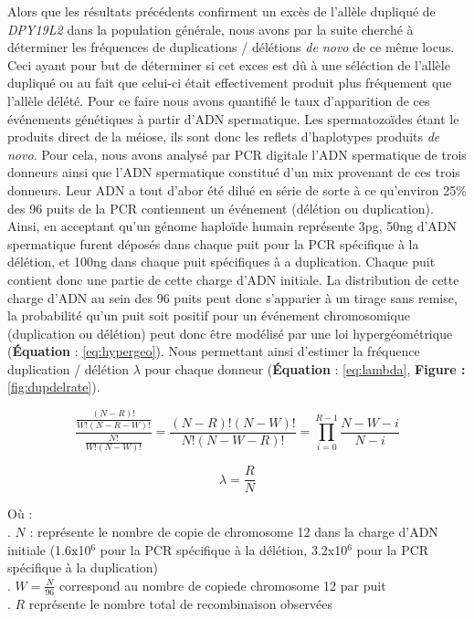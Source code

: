 \documentclass[12pt,twoside]{reedthesis}
\theoremstyle{definition}
\theoremstyle{definition}
\theoremstyle{remark}
\begin{document}
  Alors que les résultats précédents confirment un excès de l'allèle
  dupliqué de \emph{DPY19L2} dans la population générale, nous avons par
  la suite cherché à déterminer les fréquences de duplications / délétions
  \emph{de novo} de ce même locus. Ceci ayant pour but de déterminer si
  cet exces est dû à une séléction de l'allèle dupliqué ou au fait que
  celui-ci était effectivement produit plus fréquement que l'allèle
  délété. Pour ce faire nous avons quantifié le taux d'apparition de ces
  événements génétiques à partir d'ADN spermatique. Les spermatozoïdes
  étant le produits direct de la méiose, ils sont donc les reflets
  d'haplotypes produits \emph{de novo}. Pour cela, nous avons analysé par
  PCR digitale l'ADN spermatique de trois donneurs ainsi que l'ADN
  spermatique constitué d'un mix provenant de ces trois donneurs. Leur ADN
  a tout d'abor été dilué en série de sorte à ce qu'environ 25\% des 96
  puits de la PCR contiennent un événement (délétion ou duplication).
  Ainsi, en acceptant qu'un génome haploïde humain représente 3pg, 50ng
  d'ADN spermatique furent déposés dans chaque puit pour la PCR spécifique
  à la délétion, et 100ng dans chaque puit spécifiques à a duplication.
  Chaque puit contient donc une partie de cette charge d'ADN initiale. La
  distribution de cette charge d'ADN au sein des 96 puits peut donc
  s'apparier à un tirage sans remise, la probabilité qu'un puit soit
  positif pour un événement chromosomique (duplication ou délétion) peut
  donc être modélisé par une loi hypergéométrique (\textbf{Équation} :
  \eqref{eq:hypergeo}). Nous permettant ainsi d'estimer la fréquence
  duplication / délétion \(\lambda\) pour chaque donneur
  (\textbf{Équation} : \eqref{eq:lambda}, \textbf{Figure :
  }\ref{fig:dupdelrate}).
  
  \begin{equation} 
  \frac{\frac{(N - R)!}{W!(N-R-W)!}}{\frac{N!}{W!(N-W)!}} = \frac{(N-R)!(N-W)!}{N!(N-W-R)!} = \prod_{i=0}^{R-1}{\frac{N-W-i}{N-i}}
  \label{eq:hypergeo}
  \end{equation}
  
  \begin{equation} 
  \lambda = \frac{R}{N}
  \label{eq:lambda}
  \end{equation}
  
  Où :\\
  . \(N\) : représente le nombre de copie de chromosome 12 dans la charge
  d'ADN initiale (1.6x10\({^6}\) pour la PCR spécifique à la délétion,
  3.2x10\({^6}\) pour la PCR spécifique à la duplication)\\
  . \(W = \frac{N}{96}\) correspond au nombre de copiede chromosome 12 par
  puit\\
  . \(R\) représente le nombre total de recombinaison observées
  
\end{document}
